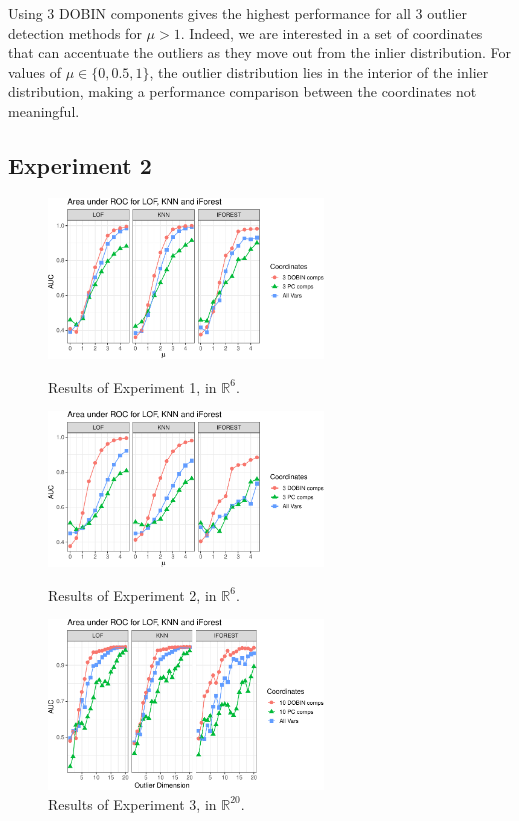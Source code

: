 \documentclass[letter,12pt]{article}
\begin{document}
Using $3$ DOBIN components gives the highest performance for all $3$ outlier detection methods for $\mu > 1$. Indeed, we are interested in a set of coordinates that can accentuate the outliers as they move out from the inlier distribution. For values of $\mu \in \{0, 0.5, 1\}$, the outlier distribution lies in the interior of the inlier distribution, making a performance comparison between the coordinates not meaningful.

\subsection{Experiment 2}

\begin{figure}[!p]
  \centering
  \includegraphics[width=0.65\textwidth]{Exp1.pdf}
  \caption{Results of Experiment 1, in $\mathbb{R}^6$.}
  \label{fig:Exp1}\vspace*{0.3cm}

  \centering
  \includegraphics[width=0.65\textwidth]{Exp2.pdf}
  \caption{Results of Experiment 2, in $\mathbb{R}^6$.}
  \label{fig:Exp2}\vspace*{0.3cm}

  \centering
  \includegraphics[width=0.65\textwidth]{Exp3.pdf}
  \caption{Results of Experiment 3, in $\mathbb{R}^{20}$.}
  \label{fig:Exp3}
\end{figure}
\end{document}
